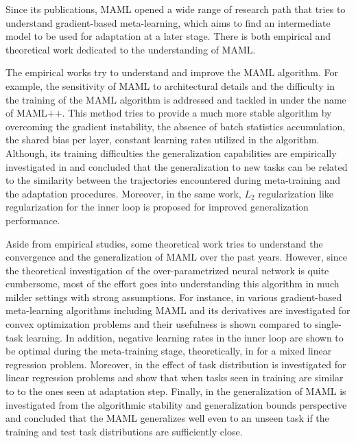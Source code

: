 
Since its publications, MAML \cite{Finn2017} opened a wide range of research path that tries to understand gradient-based meta-learning, which aims to find an intermediate model to be used for adaptation at a later stage. There is both empirical and theoretical work dedicated to the understanding of MAML.

The empirical works try to understand and improve the MAML algorithm. For example, the sensitivity of MAML to architectural details and the difficulty in the training of the MAML algorithm is addressed and tackled in \cite{Antoniou2019} under the name of MAML++. This method tries to provide a much more stable algorithm by overcoming the gradient instability, the absence of batch statistics accumulation, the shared bias per layer, constant learning rates utilized in the algorithm. Although, its training difficulties the generalization capabilities are empirically investigated in \cite{Guiroy2019a} and concluded that the generalization to new tasks can be related to the similarity between the trajectories encountered during meta-training and the adaptation procedures. Moreover, in the same work, $L_2$ regularization like regularization for the inner loop is proposed for improved generalization performance. 

Aside from empirical studies, some theoretical work tries to understand the convergence and the generalization of MAML over the past years. However, since the theoretical investigation of the over-parametrized neural network is quite cumbersome, most of the effort goes into understanding this algorithm in much milder settings with strong assumptions. For instance, in \cite{Khodak2019} various gradient-based meta-learning algorithms including MAML and its derivatives are investigated for convex optimization problems and their usefulness is shown compared to single-task learning. In addition, negative learning rates in the inner loop are shown to be optimal during the meta-training stage, theoretically, in \cite{Bernacchia2021} for a mixed linear regression problem. Moreover, in \cite{Collins2020b} the effect of task distribution is investigated for linear regression problems and show that when tasks seen in training are similar to to the ones seen at adaptation step. Finally, in \cite{Fallah2021} the generalization of MAML is investigated from the algorithmic stability and generalization bounds perspective and concluded that the MAML generalizes well even to an unseen task if the training and test task distributions are sufficiently close. 


